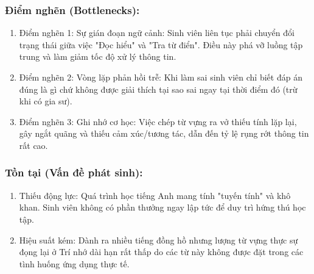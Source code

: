 \subsubsection{Điểm nghẽn (Bottlenecks):}
\begin{enumerate}[label=\alph*), nosep]
    \item Điểm nghẽn 1: Sự gián đoạn ngữ cảnh: Sinh viên liên tục phải chuyển đổi trạng thái giữa việc "Đọc hiểu" và "Tra từ điển". Điều này phá vỡ luồng tập trung  và làm giảm tốc độ xử lý thông tin.
    \item Điểm nghẽn 2: Vòng lặp phản hồi trễ: Khi làm sai sinh viên chỉ biết đáp án đúng là gì chứ không được giải thích tại sao sai ngay tại thời điểm đó (trừ khi có gia sư).
    \item Điểm nghẽn 3: Ghi nhớ cơ học: Việc chép từ vựng ra vở thiếu tính lặp lại, gây ngắt quãng và thiếu cảm xúc/tương tác, dẫn đến tỷ lệ rụng rớt thông tin rất cao.
\end{enumerate}

\subsubsection{Tồn tại (Vấn đề phát sinh):}
\begin{enumerate}[label = \alph*), nosep]
	\item Thiếu động lực: Quá trình học tiếng Anh mang tính "tuyến tính" và khô khan. Sinh viên không có phần thưởng ngay lập tức để duy trì hứng thú học tập.
	\item Hiệu suất kém: Dành ra nhiều tiếng đồng hồ nhưng lượng từ vựng thực sự đọng lại ở Trí nhớ dài hạn rất thấp do các từ này không được đặt trong các tình huống ứng dụng thực tế.
\end{enumerate}